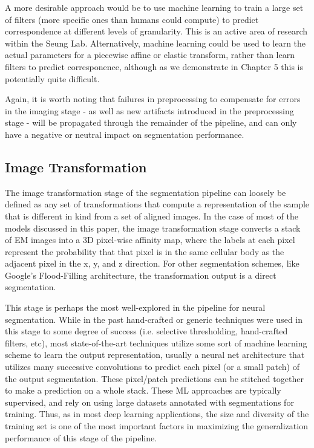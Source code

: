 A more desirable approach would be to use machine learning to train a large set of filters (more specific ones than humans could compute) to predict correspondence at different levels of granularity. This is an active area of research within the Seung Lab. Alternatively, machine learning could be used to learn the actual parameters for a piecewise affine or elastic transform, rather than learn filters to predict corresponence, although as we demonstrate in Chapter 5 this is potentially quite difficult. 

Again, it is worth noting that failures in preprocessing to compensate for errors in the imaging stage - as well as new artifacts introduced in the preprocessing stage - will be propagated through the remainder of the pipeline, and can only have a negative or neutral impact on segmentation performance.

\subsection{Image Transformation}
The image transformation stage of the segmentation pipeline can loosely be defined as any set of transformations that compute a representation of the sample that is different in kind from a set of aligned images. In the case of most of the models discussed in this paper, the image transformation stage converts a stack of EM images into a 3D pixel-wise affinity map, where the labels at each pixel represent the probability that that pixel is in the same cellular body as the adjacent pixel in the x, y, and z direction. For other segmentation schemes, like Google's Flood-Filling architecture, the transformation output is a direct segmentation. 

This stage is perhaps the most well-explored in the pipeline for neural segmentation. While in the past hand-crafted or generic techniques were used in this stage to some degree of success (i.e. selective thresholding, hand-crafted filters, etc), most state-of-the-art techniques utilize some sort of machine learning scheme to learn the output representation, usually a neural net architecture that utilizes many successive convolutions to predict each pixel (or a small patch) of the output segmentation. These pixel/patch predictions can be stitched together to make a prediction on a whole stack. These ML approaches are typically supervised, and rely on using large datasets annotated with segmentations for training. Thus, as in most deep learning applications, the size and diversity of the training set is one of the most important factors in maximizing the generalization performance of this stage of the pipeline.

